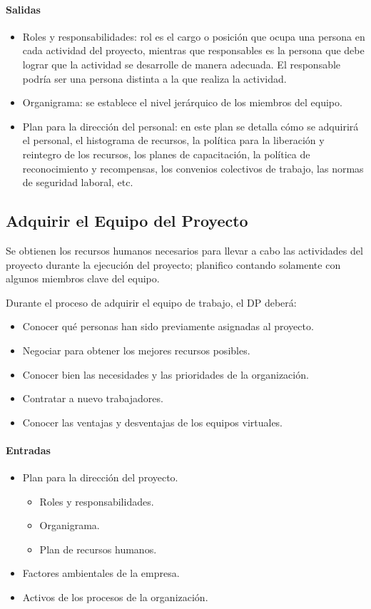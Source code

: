 \documentclass[a4paper,twosides]{article}
\newlength{\wideitemsep}
\let\olditem\item
\renewcommand{\item}{\setlength{\itemsep}{\wideitemsep}\olditem}
\begin{document}
\paragraph{Salidas}
\begin{itemize}
\item Roles y responsabilidades: rol es el cargo o posición que ocupa una persona en cada actividad del proyecto, mientras que responsables es la persona que debe lograr que la actividad se desarrolle de manera adecuada. El responsable podría ser una persona distinta a la que realiza la actividad.
\item Organigrama: se establece el nivel jerárquico de los miembros del equipo.
\item Plan para la dirección del personal: en este plan se detalla cómo se adquirirá el personal, el histograma de recursos, la política para la liberación y reintegro de los recursos, los planes de capacitación, la política de reconocimiento y recompensas, los convenios colectivos de trabajo, las normas de seguridad laboral, etc.
\end{itemize}

\subsection{Adquirir el Equipo del Proyecto} \label{sec:adquirir_equipo}
Se obtienen los recursos humanos necesarios para llevar a cabo las actividades del proyecto durante la ejecución del proyecto; planifico contando solamente con algunos miembros clave del equipo.
\par Durante el proceso de adquirir el equipo de trabajo, el DP deberá:
\begin{itemize}
\item Conocer qué personas han sido previamente asignadas al proyecto.
\item Negociar para obtener los mejores recursos posibles.
\item Conocer bien las necesidades y las prioridades de la organización.
\item Contratar a nuevo trabajadores.
\item Conocer las ventajas y desventajas de los equipos virtuales.
\end{itemize}

\paragraph{Entradas}
\begin{itemize}
\item Plan para la dirección del proyecto.
\begin{itemize}
\item Roles y responsabilidades.
\item Organigrama.
\item Plan de recursos humanos.
\end{itemize}
\item Factores ambientales de la empresa.
\item Activos de los procesos de la organización.
\end{itemize}
\end{document}
